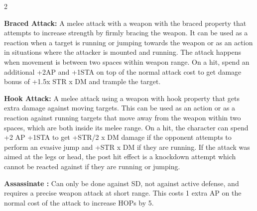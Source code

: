 \begin{multicols}{2}
{\textbf{Braced Attack:} A melee attack with a weapon with the braced property that attempts to increase strength by firmly bracing the weapon. It can be used as a reaction when a target is running or jumping towards the weapon or as an action in situations where the attacker is mounted and running. The attack happens when movement is between two spaces within weapon range. On a hit, spend an additional +2AP and +1STA on top of the normal attack cost to get damage bonus of +1.5x STR x DM and trample the target.

\textbf{Hook Attack:} A melee attack using a weapon with hook property that gets extra damage against moving targets. This can be used as an action or as a reaction against running targets that move away from the weapon within two spaces, which are both inside its melee range. On a hit, the character can spend +2 AP +1STA to get +STR/2 x DM damage if the opponent attempts to perform an evasive jump and +STR x DM if they are running. If the attack was aimed at the legs or head, the post hit effect is a knockdown attempt which cannot be reacted against if they are running or jumping.

\textbf{ Assassinate :} Can only be done against SD, not against active defense, and requires a precise weapon attack at short range. This costs 1 extra AP on the normal cost of the attack to increase HOPs by 5.
}



\end{multicols}
